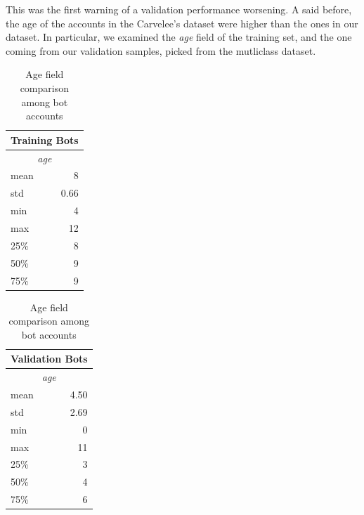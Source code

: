 This was the first warning of a validation performance worsening.
A said before, the age of the accounts in the Carvelee's dataset were higher than the ones in our dataset. In particular, we examined the \textit{age} field of the training set, and the one coming from our validation samples, picked from the mutliclass dataset.
\begin{table}[!htb]
	\caption{Age field comparison among bot accounts}
	\begin{center}
		\begin{tabular}{@{}lr@{}}
			\multicolumn{2}{c}{\textbf{Training Bots}}\\
			\hline\hline
			\multicolumn{2}{c}{\textit{age}}\\
			\hline
			\multicolumn{1}{l}{mean}& \multicolumn{1}{r}{8}\\
			\multicolumn{1}{l}{std}& \multicolumn{1}{r}{0.66}\\
			\multicolumn{1}{l}{min}& \multicolumn{1}{r}{4}\\
			\multicolumn{1}{l}{max}& \multicolumn{1}{r}{12}\\
			\multicolumn{1}{l}{25\%}& \multicolumn{1}{r}{8}\\
			\multicolumn{1}{l}{50\%}& \multicolumn{1}{r}{9}\\
			\multicolumn{1}{l}{75\%}& \multicolumn{1}{r}{9}\\
			\hline\hline
		\end{tabular}
		\begin{tabular}{@{}lr@{}}
			\multicolumn{2}{c}{\textbf{Validation Bots}}\\
			\hline\hline
			\multicolumn{2}{c}{\textit{age}}\\
			\hline
			\multicolumn{1}{l}{mean}& \multicolumn{1}{r}{4.50}\\
			\multicolumn{1}{l}{std}& \multicolumn{1}{r}{2.69}\\
			\multicolumn{1}{l}{min}& \multicolumn{1}{r}{0}\\
			\multicolumn{1}{l}{max}& \multicolumn{1}{r}{11}\\
			\multicolumn{1}{l}{25\%}& \multicolumn{1}{r}{3}\\
			\multicolumn{1}{l}{50\%}& \multicolumn{1}{r}{4}\\
			\multicolumn{1}{l}{75\%}& \multicolumn{1}{r}{6}\\
			\hline\hline
		\end{tabular}
	\end{center}
	\label{table:bots}
\end{table}


